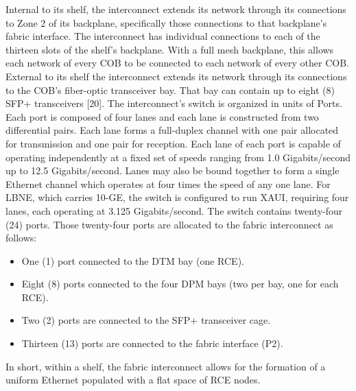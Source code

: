 Internal to its shelf, the interconnect extends its network through its connections to Zone 2 of its backplane, specifically those connections to that backplane's fabric interface. The interconnect has individual connections to each of the thirteen slots of the shelf's backplane. With a full mesh backplane, this allows each network of every COB to be connected to each network of every other COB. External to its shelf the interconnect extends its network through its connections to the COB's fiber-optic transceiver bay. That bay can contain up to eight (8) SFP+ transceivers [20].
The interconnect's switch is organized in units of Ports. Each port is composed of four lanes and each lane is constructed from two differential pairs. Each lane forms a full-duplex channel with one pair allocated for transmission and one pair for reception. Each lane of each port is capable of operating independently at a fixed set of speeds ranging from 1.0 Gigabits/second up to 12.5 Gigabits/second. Lanes may also be bound together to form a single Ethernet channel which operates at four times the speed of any one lane. For LBNE, which carries 10-GE, the switch is configured to run XAUI, requiring four lanes, each operating at 3.125 Gigabits/second. The switch contains twenty-four (24) ports. Those twenty-four ports are allocated to the fabric interconnect as follows:
\begin{itemize}
\item One (1) port connected to the DTM bay (one RCE).
\item Eight (8) ports connected to the four DPM bays (two per bay, one for each RCE).
\item Two (2) ports are connected to the SFP+ transceiver cage.
\item Thirteen (13) ports are connected to the fabric interface (P2).
\end{itemize}
In short, within a shelf, the fabric interconnect allows for the formation of a uniform Ethernet populated with a flat space of RCE nodes.

